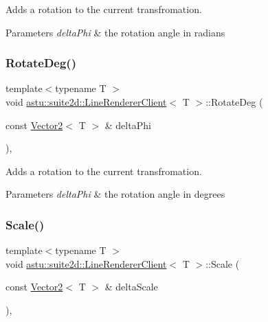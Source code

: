 Adds a rotation to the current transfromation.


\begin{DoxyParams}{Parameters}
{\em delta\+Phi} & the rotation angle in radians \\
\hline
\end{DoxyParams}
\mbox{\label{classastu_1_1suite2d_1_1LineRendererClient_af4c5038b72648837eedc0b564e14665e}} 
\subsubsection{\texorpdfstring{Rotate\+Deg()}{RotateDeg()}}
{\footnotesize\ttfamily template$<$typename T $>$ \\
void \hyperlink{classastu_1_1suite2d_1_1LineRendererClient}{astu\+::suite2d\+::\+Line\+Renderer\+Client}$<$ T $>$\+::Rotate\+Deg (\begin{DoxyParamCaption}\item[{const \hyperlink{classastu_1_1Vector2}{Vector2}$<$ T $>$ \&}]{delta\+Phi }\end{DoxyParamCaption})\hspace{0.3cm}{\ttfamily [inline]}, {\ttfamily [protected]}}

Adds a rotation to the current transfromation.


\begin{DoxyParams}{Parameters}
{\em delta\+Phi} & the rotation angle in degrees \\
\hline
\end{DoxyParams}
\mbox{\label{classastu_1_1suite2d_1_1LineRendererClient_a58ef9f84ea71a512f5c1324ee47e40ee}} 
\subsubsection{\texorpdfstring{Scale()}{Scale()}}
{\footnotesize\ttfamily template$<$typename T $>$ \\
void \hyperlink{classastu_1_1suite2d_1_1LineRendererClient}{astu\+::suite2d\+::\+Line\+Renderer\+Client}$<$ T $>$\+::Scale (\begin{DoxyParamCaption}\item[{const \hyperlink{classastu_1_1Vector2}{Vector2}$<$ T $>$ \&}]{delta\+Scale }\end{DoxyParamCaption})\hspace{0.3cm}{\ttfamily [inline]}, {\ttfamily [protected]}}

